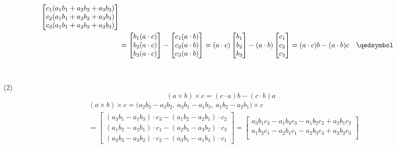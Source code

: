 \documentclass{article}
\begin{document}
\begin{enumerate}[(a)]
\begin{align*}
\begin{bmatrix}
                    c_1(a_1b_1 + a_2b_2 + a_3b_3)\\
                    c_2(a_1b_1 +a_2b_2 + a_3b_3)\\
                    c_3(a_1b_1 + a_2b_2+a_3b_3)
                \end{bmatrix}\\
                &= \begin{bmatrix}
                    b_1(a\cdot c)\\
                    b_2(a\cdot c)\\
                    b_3(a\cdot c)
                \end{bmatrix} - \begin{bmatrix}
                    c_1(a\cdot b)\\
                    c_2(a\cdot b)\\
                    c_3(a\cdot b)
                \end{bmatrix} = (a\cdot c)\begin{bmatrix}
                    b_1\\b_2\\b_3
                \end{bmatrix} - (a\cdot b)\begin{bmatrix}
                    c_1\\c_2\\c_3
                \end{bmatrix} = (a\cdot c)b - (a\cdot b)c \quad\qedsymbol
        \end{align*}\\\\
        (2)
        $$\boxed{(a\times b)\times c = (c\cdot a)b-(c\cdot b)a}$$
        \begin{align*}
            &(a\times b)\times c = \big( a_2b_3 - a_3b_2,\ a_3b_1 - a_1b_3,\ a_1b_2 - a_2b_1\big)\times c\\
            &= \begin{bmatrix}
                (a_3b_1 - a_1b_3)\cdot c_3 - (a_1b_2 - a_2b_1)\cdot c_2\\
                (a_1b_2 - a_2b_1)\cdot c_1- (a_2b_3 - a_3b_2)\cdot c_3\\
                (a_2b_3 - a_3b_2)\cdot c_2 - (a_3b_1 - a_1b_3)\cdot c_1
            \end{bmatrix} = \begin{bmatrix}
                a_3b_1c_3 - a_1b_3c_3 - a_1b_2c_2 + a_2b_1c_2\\
                a_1b_2c_1 - a_2b_1c_1 - a_2b_3c_3 + a_3b_2c_3\\

\end{bmatrix}
\end{align*}
\end{enumerate}
\end{document}
